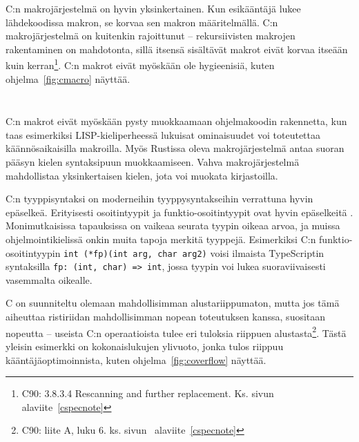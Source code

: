 C:n makrojärjestelmä on hyvin yksinkertainen. Kun esikääntäjä lukee
lähdekoodissa makron, se korvaa sen makron määritelmällä. C:n makrojärjestelmä
on kuitenkin rajoittunut -- rekursiivisten makrojen rakentaminen on mahdotonta,
sillä itsensä sisältävät makrot eivät korvaa itseään kuin kerran\footnote{C90:
3.8.3.4 Rescanning and further replacement. Ks. sivun~\pageref{cspecnote}
alaviite~\ref{cspecnote}}. C:n makrot eivät myöskään ole hygieenisiä, kuten
ohjelma~\ref{fig:cmacro} näyttää.

\begin{listing}[ht!]
    \inputminted{C}{c-hygiene.c}
    \inputminted{text}{c-hygiene-output.txt}
    \caption{C:n makrot eivät ole hygieenisiä. DOUBLE-makro muuttuu
    käännösvaiheessa muotoon 1+1*2, joka on laskujärjestyksen takia 3 eikä
    odotettu 4. Koko printf-kutsuksi muodostuu siis
    ''\texttt{printf("one plus one doubled is \%d", 1+1*2)}''}
    \label{fig:cmacro}
\end{listing}

C:n makrot eivät myöskään pysty muokkaamaan ohjelmakoodin rakennetta, kun taas
esimerkiksi LISP-kieliperheessä lukuisat ominaisuudet voi toteutettaa
käännösaikaisilla makroilla. Myös Rustissa oleva makrojärjestelmä antaa suoran
pääsyn kielen syntaksipuun muokkaamiseen. Vahva makrojärjestelmä mahdollistaa
yksinkertaisen kielen, jota voi muokata kirjastoilla.

C:n tyyppisyntaksi on moderneihin tyyppysyntakseihin verrattuna hyvin epäselkeä.
Erityisesti osoitintyypit ja funktio-osoitintyypit ovat hyvin epäselkeitä
. Monimutkaisissa tapauksissa on vaikeaa seurata tyypin oikeaa
arvoa, ja muissa ohjelmointikielissä onkin muita tapoja merkitä tyyppejä.
Esimerkiksi C:n funktio-osoitintyypin \texttt{int~(*fp)(int~arg,~char~arg2)}
voisi ilmaista TypeScriptin syntaksilla \texttt{fp:~(int,~char)~=>~int}, jossa
tyypin voi lukea suoraviivaisesti vasemmalta oikealle.

\newpage

C on suunniteltu olemaan mahdollisimman alustariippumaton, mutta jos tämä
aiheuttaa ristiriidan mahdollisimman nopean toteutuksen kanssa, suositaan
nopeutta -- useista C:n operaatioista tulee eri tuloksia riippuen
alustasta\footnote{C90: liite A, luku 6. ks. sivun~\pageref{cspecnote}
alaviite~\ref{cspecnote}}. Tästä yleisin esimerkki on kokonaislukujen ylivuoto,
jonka tulos riippuu kääntäjäoptimoinnista, kuten ohjelma~\ref{fig:coverflow}
näyttää.

